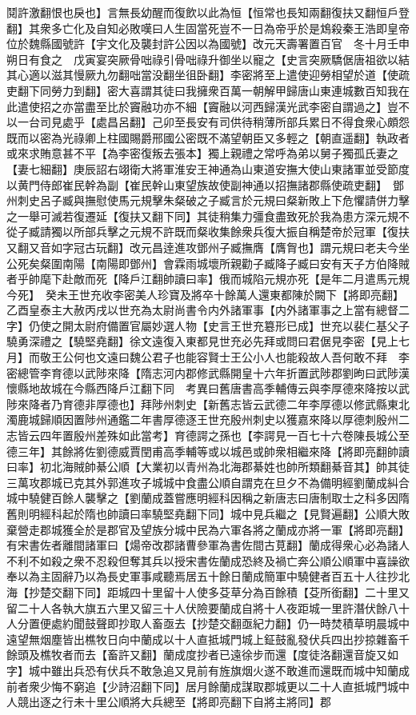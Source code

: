 鬩許激翻恨也戾也】言無長幼醒而復飲以此為恒【恒常也長知兩翻復扶又翻恒戶登翻】其衆多亡化及自知必敗嘆曰人生固當死豈不一日為帝乎於是鴆殺秦王浩即皇帝位於魏縣國號許【宇文化及襲封許公因以為國號】改元天壽署置百官　冬十月壬申朔日有食之　戊寅宴突厥骨咄祿引骨咄祿升御坐以寵之【史言突厥驕倨唐祖欲以結其心適以滋其慢厥九勿翻咄當没翻坐徂卧翻】李密將至上遣使迎勞相望於道【使疏吏翻下同勞力到翻】密大喜謂其徒曰我擁衆百萬一朝解甲歸唐山東連城數百知我在此遣使招之亦當盡至比於竇融功亦不細【竇融以河西歸漢光武李密自謂過之】豈不以一台司見處乎【處昌呂翻】己卯至長安有司供待稍薄所部兵累日不得食衆心頗怨既而以密為光祿卿上柱國賜爵邢國公密既不滿望朝臣又多輕之【朝直遥翻】執政者或來求賄意甚不平【為李密復叛去張本】獨上親禮之常呼為弟以舅子獨孤氏妻之【妻七細翻】庚辰詔右翊衛大將軍淮安王神通為山東道安撫大使山東諸軍並受節度以黄門侍郎崔民幹為副【崔民幹山東望族故使副神通以招撫諸郡縣使疏吏翻】　鄧州刺史呂子臧與撫慰使馬元規擊朱粲破之子臧言於元規曰粲新敗上下危懼請併力擊之一舉可滅若復遷延【復扶又翻下同】其徒稍集力彊食盡致死於我為患方深元規不從子臧請獨以所部兵擊之元規不許既而粲收集餘衆兵復大振自稱楚帝於冠軍【復扶又翻又音如字冠古玩翻】改元昌逹進攻鄧州子臧撫膺【膺胷也】謂元規曰老夫今坐公死矣粲圍南陽【南陽即鄧州】會霖雨城壞所親勸子臧降子臧曰安有天子方伯降賊者乎帥麾下赴敵而死【降戶江翻帥讀曰率】俄而城陷元規亦死【是年二月遣馬元規今死】　癸未王世充收李密美人珍寶及將卒十餘萬人還東都陳於闕下【將即亮翻】乙酉皇泰主大赦丙戌以世充為太尉尚書令内外諸軍事【内外諸軍事之上當有總督二字】仍使之開太尉府備置官屬妙選人物【史言王世充簒形已成】世充以裴仁基父子驍勇深禮之【驍堅堯翻】徐文遠復入東都見世充必先拜或問曰君倨見李密【見上七月】而敬王公何也文遠曰魏公君子也能容賢士王公小人也能殺故人吾何敢不拜　李密總管李育德以武陟來降【隋志河内郡修武縣開皇十六年折置武陟郡劉昫曰武陟漢懷縣地故城在今縣西降戶江翻下同　考異曰舊唐書高季輔傳云與李厚德來降按以武陟來降者乃育德非厚德也】拜陟州刺史【新舊志皆云武德二年李厚德以修武縣東北濁鹿城歸順因置陟州通鑑二年書厚德逐王世充殷州刺史以獲嘉來降以厚德刺殷州二志皆云四年置殷州差殊如此當考】育德諤之孫也【李諤見一百七十六卷陳長城公至德三年】其餘將佐劉德威賈閏甫高季輔等或以城邑或帥衆相繼來降【將即亮翻帥讀曰率】初北海賊帥綦公順【大業初以青州為北海郡綦姓也帥所類翻綦音其】帥其徒三萬攻郡城已克其外郭進攻子城城中食盡公順自謂克在旦夕不為備明經劉蘭成糾合城中驍健百餘人襲擊之【劉蘭成蓋嘗應明經科因稱之新唐志曰唐制取士之科多因隋舊則明經科起於隋也帥讀曰率驍堅堯翻下同】城中見兵繼之【見賢遍翻】公順大敗棄營走郡城獲全於是郡官及望族分城中民為六軍各將之蘭成亦將一軍【將即亮翻】有宋書佐者離間諸軍曰【煬帝改郡諸曹參軍為書佐間古莧翻】蘭成得衆心必為諸人不利不如殺之衆不忍殺但奪其兵以授宋書佐蘭成恐終及禍亡奔公順公順軍中喜譟欲奉以為主固辭乃以為長史軍事咸聽焉居五十餘日蘭成簡軍中驍健者百五十人往抄北海【抄楚交翻下同】距城四十里留十人使多芟草分為百餘積【芟所銜翻】二十里又留二十人各執大旗五六里又留三十人伏險要蘭成自將十人夜距城一里許潛伏餘八十人分置便處約聞鼓聲即抄取人畜亟去【抄楚交翻亟紀力翻】仍一時焚積草明晨城中遠望無烟塵皆出樵牧日向中蘭成以十人直抵城門城上鉦鼓亂發伏兵四出抄掠雜畜千餘頭及樵牧者而去【畜許又翻】蘭成度抄者已遠徐步而還【度徒洛翻還音旋又如字】城中雖出兵恐有伏兵不敢急追又見前有旌旗烟火遂不敢進而還既而城中知蘭成前者衆少悔不窮追【少詩沼翻下同】居月餘蘭成謀取郡城更以二十人直抵城門城中人競出逐之行未十里公順將大兵總至【將即亮翻下自將主將同】郡